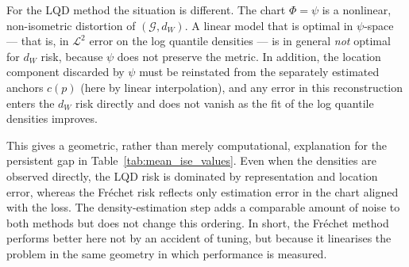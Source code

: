 \begin{postsub}
For the LQD method the situation is different. The chart $\Phi = \psi$ is a nonlinear,
non-isometric distortion of $(\mathcal{G}, d_W)$. A linear model that is optimal in
$\psi$-space --- that is, in $\mathcal{L}^2$ error on the log quantile densities --- is in
general \emph{not} optimal for $d_W$ risk, because $\psi$ does not preserve the metric. In
addition, the location component discarded by $\psi$ must be reinstated from the separately
estimated anchors $c(p)$ (here by linear interpolation), and any error in this
reconstruction enters the $d_W$ risk directly and does not vanish as the fit of the log
quantile densities improves.

This gives a geometric, rather than merely computational, explanation for the persistent
gap in Table~\ref{tab:mean_ise_values}. Even when the densities are observed directly, the
LQD risk is dominated by representation and location error, whereas the Fréchet risk
reflects only estimation error in the chart aligned with the loss. The density-estimation
step adds a comparable amount of noise to both methods but does not change this ordering.
In short, the Fréchet method performs better here not by an accident of tuning, but
because it linearises the problem in the same geometry in which performance is measured.
\end{postsub}
